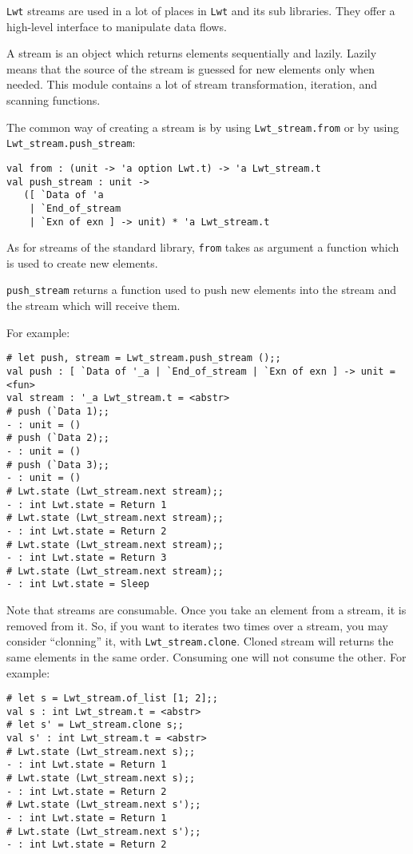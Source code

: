 \documentclass{article}
\newcommand{\lwt}{\texttt{Lwt}\xspace}
\begin{document}
\lwt streams are used in a lot of places in \lwt and its sub
libraries. They offer a high-level interface to manipulate data flows.

A stream is an object which returns elements sequentially and
lazily. Lazily means that the source of the stream is guessed for new
elements only when needed. This module contains a lot of stream
transformation, iteration, and scanning functions.

The common way of creating a stream is by using
\texttt{Lwt\_stream.from} or by using
\texttt{Lwt\_stream.push\_stream}:

\begin{verbatim}
val from : (unit -> 'a option Lwt.t) -> 'a Lwt_stream.t
val push_stream : unit ->
   ([ `Data of 'a
    | `End_of_stream
    | `Exn of exn ] -> unit) * 'a Lwt_stream.t
\end{verbatim}

As for streams of the standard library, \texttt{from} takes as
argument a function which is used to create new elements.

\texttt{push\_stream} returns a function used to push new elements
into the stream and the stream which will receive them.

For example:

\begin{verbatim}
# let push, stream = Lwt_stream.push_stream ();;
val push : [ `Data of '_a | `End_of_stream | `Exn of exn ] -> unit = <fun>
val stream : '_a Lwt_stream.t = <abstr>
# push (`Data 1);;
- : unit = ()
# push (`Data 2);;
- : unit = ()
# push (`Data 3);;
- : unit = ()
# Lwt.state (Lwt_stream.next stream);;
- : int Lwt.state = Return 1
# Lwt.state (Lwt_stream.next stream);;
- : int Lwt.state = Return 2
# Lwt.state (Lwt_stream.next stream);;
- : int Lwt.state = Return 3
# Lwt.state (Lwt_stream.next stream);;
- : int Lwt.state = Sleep
\end{verbatim}

Note that streams are consumable. Once you take an element from a
stream, it is removed from it. So, if you want to iterates two times
over a stream, you may consider ``clonning'' it, with
\texttt{Lwt\_stream.clone}. Cloned stream will returns the same
elements in the same order. Consuming one will not consume the other.
For example:

\begin{verbatim}
# let s = Lwt_stream.of_list [1; 2];;
val s : int Lwt_stream.t = <abstr>
# let s' = Lwt_stream.clone s;;
val s' : int Lwt_stream.t = <abstr>
# Lwt.state (Lwt_stream.next s);;
- : int Lwt.state = Return 1
# Lwt.state (Lwt_stream.next s);;
- : int Lwt.state = Return 2
# Lwt.state (Lwt_stream.next s');;
- : int Lwt.state = Return 1
# Lwt.state (Lwt_stream.next s');;
- : int Lwt.state = Return 2
\end{verbatim}
\end{document}
